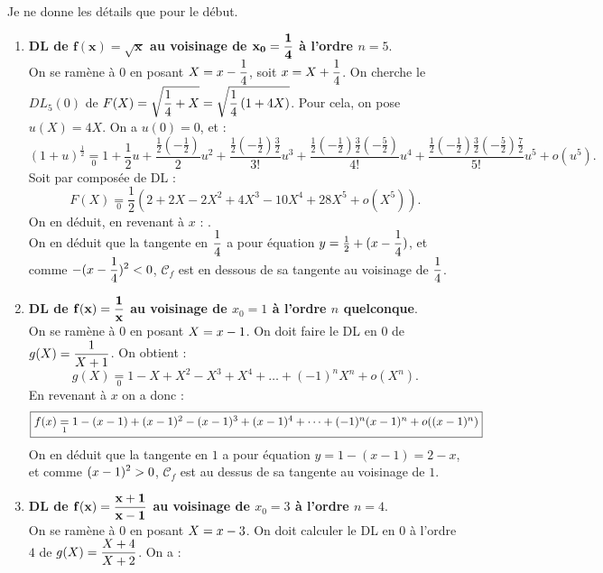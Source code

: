 \documentclass[a4paper, 11pt,reqno]{article}
\begin{document}
\begin{correction}  \; Je ne donne les d\'etails que pour le d\'ebut.
	\begin{enumerate}
		\item \textbf{DL de $\mathbf{f(x)=\sqrt{x}}$ au voisinage de $\mathbf{x_0=\displaystyle\frac{1}{4}}$ \`a l'ordre $n=5$}.\\
		      On se ram\`ene \`a $0$ en posant $\displaystyle X=x-\frac{1}{4}$, soit $\displaystyle x=X+\frac{1}{4}$. On cherche le $DL_5(0)$ de $\displaystyle F(X) = \sqrt{\frac{1}{4}+X} = \sqrt{\frac{1}{4} \left(1+4X\right)}$. Pour cela, on pose $u(X) = 4X$. On a $u(0)=0$, et :
		      $$(1+u)^\frac{1}{2} \underset{0}{=} 1+\frac{1}{2} u + \frac{\frac{1}{2}\left(-\frac{1}{2}\right)}{2} u^2 + \frac{\frac{1}{2}\left(-\frac{1}{2}\right)\frac{3}{2}}{3!} u^3 + \frac{\frac{1}{2}\left(-\frac{1}{2}\right)\frac{3}{2}\left(-\frac{5}{2}\right)}{4!} u^4 + \frac{\frac{1}{2}\left(-\frac{1}{2}\right)\frac{3}{2}\left(-\frac{5}{2}\right)\frac{7}{2}}{5!} u^5 + o(u^5).$$
		      Soit par compos\'ee de DL :
		      $$F(X) \underset{0}{=} \frac{1}{2} \left( 2 + 2X -2X^2+4X^3-10X^4+28X^5  + o(X^5)\right).$$
		      On en d\'eduit, en revenant \`a $x$ : .\\
		      On en d\'eduit que la tangente en $\displaystyle\frac{1}{4}$ a pour \'equation $y=\frac{1}{2} +(x-\displaystyle\frac{1}{4})$, et comme $\displaystyle -(x-\displaystyle\frac{1}{4})^2<0$, $\mathcal{C}_f$ est en dessous de sa tangente au voisinage de $\displaystyle\frac{1}{4}$.
		\item \textbf{DL de $\mathbf{f(x)=\displaystyle\frac{1}{x}}$ au voisinage de $x_0=1$ \`a l'ordre $n$ quelconque}.\\
		      On se ram\`ene \`a $0$ en posant $\displaystyle X=x-1$. On doit faire le DL en $0$ de $g(X) = \displaystyle \frac{1}{X+1}$. On obtient :
		      $$g(X) \underset{0}{=} 1 - X + X^2 -X^3 + X^4 + \ldots + (-1)^{n} X^n + o(X^n).$$
		      En revenant \`a $x$ on a donc :
		      $$\fbox{$f(x)\underset{1}{=} 1 - (x-1) + (x-1)^2-(x-1)^3+(x-1)^4+\dots+(-1)^{n}(x-1)^n   + o((x-1)^n)$}$$
		      On en d\'eduit que la tangente en $1$ a pour \'equation $y=1-(x-1)=2-x$, et comme $\displaystyle (x-1)^2>0$, $\mathcal{C}_f$ est au dessus de sa tangente au voisinage de $1$.
		\item \textbf{DL de $\mathbf{f(x)=\displaystyle\frac{x+1}{x-1}}$ au voisinage de $x_0=3$ \`a l'ordre $n=4$}.\\
		      On se ram\`ene \`a $0$ en posant $\displaystyle X=x-3$. On doit calculer le DL en $0$ \`a l'ordre $4$ de $g(X) = \displaystyle \frac{X+4}{X+2}$. On a :

\end{enumerate}
\end{correction}
\end{document}
